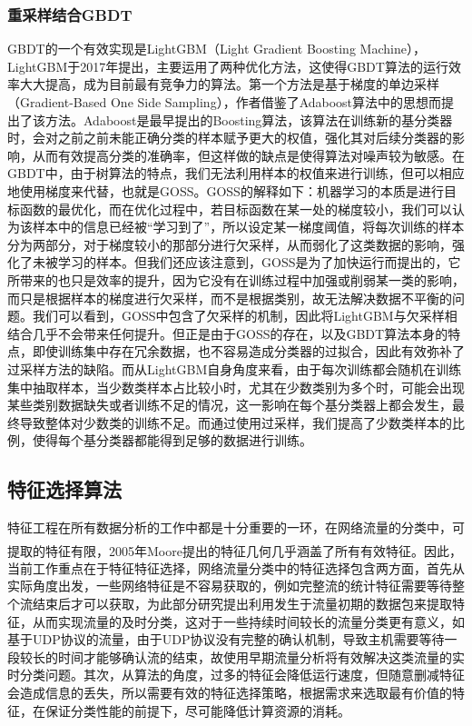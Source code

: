 \documentclass[a4papper]{article}
\newcommand{\upcite}[1]{\textsuperscript{\textsuperscript{\cite{#1}}}}%
\begin{document}
\subsubsection{重采样结合GBDT}
\par\setlength{\parindent}{2em} %
GBDT的一个有效实现是LightGBM（Light Gradient Boosting Machine），LightGBM于2017年提出，主要运用了两种优化方法，这使得GBDT算法的运行效率大大提高，成为目前最有竞争力的算法。第一个方法是基于梯度的单边采样（Gradient-Based One Side Sampling），作者借鉴了Adaboost算法中的思想而提出了该方法。Adaboost是最早提出的Boosting算法，该算法在训练新的基分类器时，会对之前之前未能正确分类的样本赋予更大的权值，强化其对后续分类器的影响，从而有效提高分类的准确率，但这样做的缺点是使得算法对噪声较为敏感。在GBDT中，由于树算法的特点，我们无法利用样本的权值来进行训练，但可以相应地使用梯度来代替，也就是GOSS。GOSS的解释如下：机器学习的本质是进行目标函数的最优化，而在优化过程中，若目标函数在某一处的梯度较小，我们可以认为该样本中的信息已经被“学习到了”，所以设定某一梯度阈值，将每次训练的样本分为两部分，对于梯度较小的那部分进行欠采样，从而弱化了这类数据的影响，强化了未被学习的样本。但我们还应该注意到，GOSS是为了加快运行而提出的，它所带来的也只是效率的提升，因为它没有在训练过程中加强或削弱某一类的影响，而只是根据样本的梯度进行欠采样，而不是根据类别，故无法解决数据不平衡的问题。我们可以看到，GOSS中包含了欠采样的机制，因此将LightGBM与欠采样相结合几乎不会带来任何提升。但正是由于GOSS的存在，以及GBDT算法本身的特点，即使训练集中存在冗余数据，也不容易造成分类器的过拟合，因此有效弥补了过采样方法的缺陷。而从LightGBM自身角度来看，由于每次训练都会随机在训练集中抽取样本，当少数类样本占比较小时，尤其在少数类别为多个时，可能会出现某些类别数据缺失或者训练不足的情况，这一影响在每个基分类器上都会发生，最终导致整体对少数类的训练不足。而通过使用过采样，我们提高了少数类样本的比例，使得每个基分类器都能得到足够的数据进行训练。

\subsection{特征选择算法}
特征工程在所有数据分析的工作中都是十分重要的一环，在网络流量的分类中，可提取的特征有限，2005年Moore提出的特征几何几乎涵盖了所有有效特征。\upcite{moore2005discriminators}因此，当前工作重点在于特征特征选择，网络流量分类中的特征选择包含两方面，首先从实际角度出发，一些网络特征是不容易获取的，例如完整流的统计特征需要等待整个流结束后才可以获取，为此部分研究提出利用发生于流量初期的数据包来提取特征，从而实现流量的及时分类，这对于一些持续时间较长的流量分类更有意义，如基于UDP协议的流量，由于UDP协议没有完整的确认机制，导致主机需要等待一段较长的时间才能够确认流的结束，故使用早期流量分析将有效解决这类流量的实时分类问题。其次，从算法的角度，过多的特征会降低运行速度，但随意删减特征会造成信息的丢失，所以需要有效的特征选择策略，根据需求来选取最有价值的特征，在保证分类性能的前提下，尽可能降低计算资源的消耗。
\end{document}
